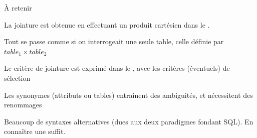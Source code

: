 \begin{frame}{À retenir}

La jointure est obtenue en effectuant un produit cartésien dans le .

\vfill

\begin{redbullet}
 \item Tout se passe comme si on interrogeait une seule table, celle
     définie par $table_1 \times table_2$
  \item Le critère de jointure est exprimé dans le ,
       avec les critères (éventuels) de sélection
  \item Les synonymes (attributs ou tables) entrainent des ambiguités, 
      et nécessitent des renommages
\end{redbullet}

\vfill

Beaucoup de syntaxes alternatives (dues aux deux paradigmes fondant SQL). En connaître 
une suffit.

\end{frame}

